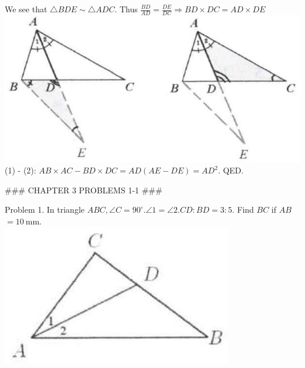 \documentclass[10pt]{article}
\begin{document}
We see that \(\triangle B D E \sim \triangle A D C\). Thus \(\frac{B D}{A D}=\frac{D E}{D C} \Rightarrow B D \times D C=A D \times D E\)\\
\includegraphics[max width=\textwidth, center]{2025_04_17_97bc1f7e44d93c271a88g-063}\\
(1) - (2): \(A B \times A C-B D \times D C=A D(A E-D E)=A D^{2}\). QED.

### CHAPTER 3 PROBLEMS 1-1 ###

Problem 1. In triangle \(A B C, \angle C=90^{\circ} . \angle 1=\angle 2 . C D: B D=3: 5\). Find \(B C\) if \(A B\) \(=10 \mathrm{~mm}\).\\
\includegraphics[max width=\textwidth, center]{2025_04_17_97bc1f7e44d93c271a88g-064(1)}
\end{document}
